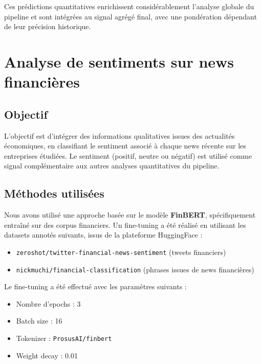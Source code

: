 \documentclass[a4paper,12pt]{article}
\begin{document}

Ces prédictions quantitatives enrichissent considérablement l’analyse globale du pipeline et sont intégrées au signal agrégé final, avec une pondération dépendant de leur précision historique.


\section{Analyse de sentiments sur news financières}

\subsection*{Objectif}

L'objectif est d'intégrer des informations qualitatives issues des actualités économiques, en classifiant le sentiment associé à chaque news récente sur les entreprises étudiées. Le sentiment (positif, neutre ou négatif) est utilisé comme signal complémentaire aux autres analyses quantitatives du pipeline.

\subsection*{Méthodes utilisées}

Nous avons utilisé une approche basée sur le modèle \textbf{FinBERT}, spécifiquement entraîné sur des corpus financiers. Un fine-tuning a été réalisé en utilisant les datasets annotés suivants, issus de la plateforme HuggingFace :
\begin{itemize}
    \item \texttt{zeroshot/twitter-financial-news-sentiment} (tweets financiers)
    \item \texttt{nickmuchi/financial-classification} (phrases issues de news financières)
\end{itemize}

Le fine-tuning a été effectué avec les paramètres suivants :
\begin{itemize}
    \item Nombre d'epochs : 3
    \item Batch size : 16
    \item Tokenizer : \texttt{ProsusAI/finbert}
    \item Weight decay : 0.01
\end{itemize}
\end{document}
